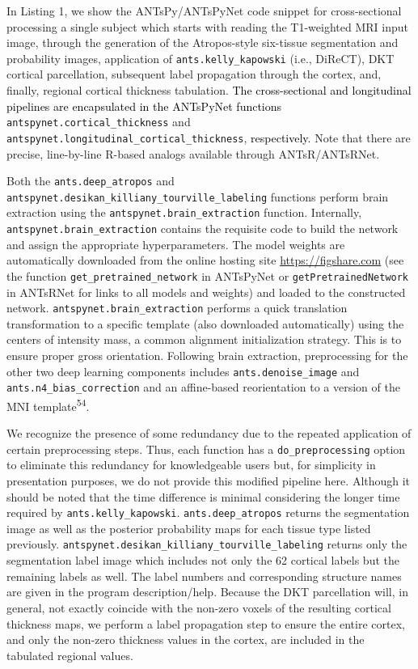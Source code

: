 \documentclass[12pt,]{article}
\begin{document}

In Listing 1, we show the ANTsPy/ANTsPyNet code snippet for
cross-sectional processing a single subject which starts with reading
the T1-weighted MRI input image, through the generation of the
Atropos-style six-tissue segmentation and probability images,
application of \texttt{ants.kelly\_kapowski} (i.e., DiReCT), DKT
cortical parcellation, subsequent label propagation through the cortex,
and, finally, regional cortical thickness tabulation.
\textcolor{black}{The
cross-sectional and longitudinal pipelines are encapsulated in the ANTsPyNet
functions} \texttt{antspynet.cortical\_thickness} and
\texttt{antspynet.longitudinal\_cortical\_thickness},
\textcolor{black}{respectively.} Note that there are precise,
line-by-line R-based analogs available through ANTsR/ANTsRNet.

Both the \texttt{ants.deep\_atropos} and
\texttt{antspynet.desikan\_killiany\_tourville\_labeling} functions
perform brain extraction using the \texttt{antspynet.brain\_extraction}
function. Internally, \texttt{antspynet.brain\_extraction} contains the
requisite code to build the network and assign the appropriate
hyperparameters. The model weights are automatically downloaded from the
online hosting site \url{https://figshare.com} (see the function
\texttt{get\_pretrained\_network} in ANTsPyNet or
\texttt{getPretrainedNetwork} in ANTsRNet for links to all models and
weights) and loaded to the constructed network.
\texttt{antspynet.brain\_extraction} performs a quick translation
transformation to a specific template (also downloaded automatically)
using the centers of intensity mass, a common alignment initialization
strategy. This is to ensure proper gross orientation. Following brain
extraction, preprocessing for the other two deep learning components
includes \texttt{ants.denoise\_image} and
\texttt{ants.n4\_bias\_correction} and an affine-based reorientation to
a version of the MNI template\textsuperscript{54}.

We recognize the presence of some redundancy due to the repeated
application of certain preprocessing steps. Thus, each function has a
\texttt{do\_preprocessing} option to eliminate this redundancy for
knowledgeable users but, for simplicity in presentation purposes, we do
not provide this modified pipeline here. Although it should be noted
that the time difference is minimal considering the longer time required
by \texttt{ants.kelly\_kapowski}. \texttt{ants.deep\_atropos} returns
the segmentation image as well as the posterior probability maps for
each tissue type listed previously.
\texttt{antspynet.desikan\_killiany\_tourville\_labeling} returns only
the segmentation label image which includes not only the 62 cortical
labels but the remaining labels as well. The label numbers and
corresponding structure names are given in the program description/help.
Because the DKT parcellation will, in general, not exactly coincide with
the non-zero voxels of the resulting cortical thickness maps, we perform
a label propagation step to ensure the entire cortex, and only the
non-zero thickness values in the cortex, are included in the tabulated
regional values.
\end{document}
